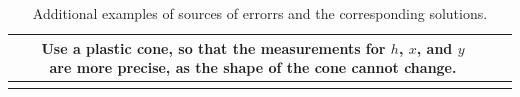 \documentclass[oneside]{book}
\begin{document}
\begin{itemize}
\begin{longtable}{|Sc|Sc|}
\begin{minipage}{0.5\textwidth-25.2pt}
        \end{minipage}&
        \begin{minipage}{0.5\textwidth-25.2pt}
            Use a plastic cone, so that the measurements for \(h\), \(x\), and \(y\) are more precise, as the shape of the cone cannot change.
        \end{minipage}\\
        \hline
            
            
    \caption{Additional examples of sources of errorrs and the corresponding solutions.}
    \label{table:sources-of-error-and-solutions}
    \end{longtable}
\end{itemize}
\end{document}
